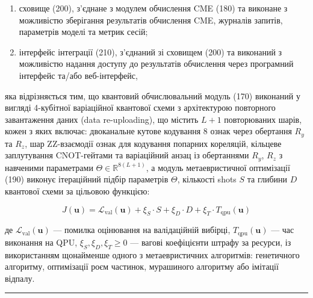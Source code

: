 \documentclass[12pt,a4paper]{article}
\begin{document}
\begin{enumerate}

\def\labelenumi{(\roman{enumi})}

\setcounter{enumi}{10}

\item

  сховище (200), з'єднане з модулем обчислення CME (180) та виконане з можливістю зберігання результатів обчислення CME, журналів запитів, параметрів моделі та метрик сесій;

\item

  інтерфейс інтеграції (210), з'єднаний зі сховищем (200) та виконаний з можливістю надання доступу до результатів обчислення через програмний інтерфейс та/або веб-інтерфейс,

\end{enumerate}



яка відрізняється тим, що квантовий обчислювальний модуль (170) виконаний у вигляді 4-кубітної варіаційної квантової схеми з архітектурою повторного завантаження даних (data re-uploading), що містить \(L + 1\) повторюваних шарів, кожен з яких включає: двоканальне кутове кодування 8 ознак через обертання \(R_y\) та \(R_z\), шар ZZ-взаємодії ознак для кодування попарних кореляцій, кільцеве заплутування CNOT-гейтами та варіаційний анзац із обертаннями \(R_y\), \(R_z\) з навченими параметрами \(\Theta \in \mathbb{R}^{8(L+1)}\), а модуль метаевристичної оптимізації (190) виконує ітераційний підбір параметрів \(\Theta\), кількості shots \(S\) та глибини \(D\) квантової схеми за цільовою функцією:



\[J(\mathbf{u}) = \mathcal{L}_{\text{val}}(\mathbf{u}) + \xi_S \cdot S + \xi_D \cdot D + \xi_T \cdot T_{\text{qpu}}(\mathbf{u})\]



де \(\mathcal{L}_{\text{val}}(\mathbf{u})\) --- помилка оцінювання на валідаційній вибірці, \(T_{\text{qpu}}(\mathbf{u})\) --- час виконання на QPU, \(\xi_S, \xi_D, \xi_T \geq 0\) --- вагові коефіцієнти штрафу за ресурси, із використанням щонайменше одного з метаевристичних алгоритмів: генетичного алгоритму, оптимізації роєм частинок, мурашиного алгоритму або імітації відпалу.



\begin{center}\rule{0.5\linewidth}{0.5pt}\end{center}
\end{document}
